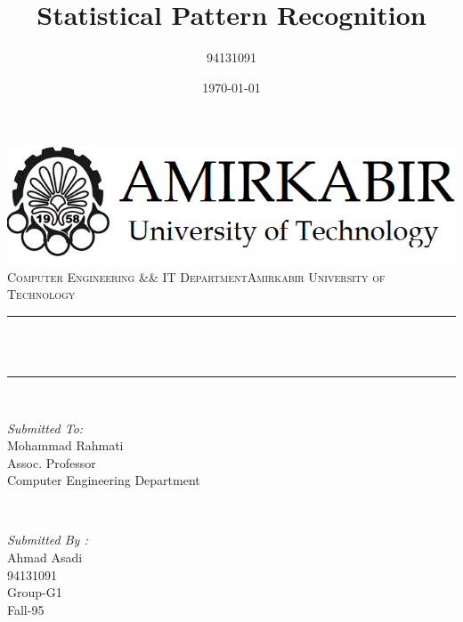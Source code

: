 \documentclass[12pt]{article}
\title{Statistical Pattern Recognition}								%
\author{94131091}								%
\date{\today}											%
\makeatletter
\let\thetitle\@title
\makeatother
\begin{document}

\begin{titlepage}
	\centering
    \vspace*{0.5 cm}
    \includegraphics[scale = 0.4]{Imgs/logo.png}\\[1.0 cm]	%
    \textsc{\Large Computer Engineering \&\& IT Department\newline\newline Amirkabir University of Technology}\\[2.0 cm]	%
	\rule{\linewidth}{0.2 mm} \\[0.4 cm]
	{ \huge \bfseries \thetitle}\\
	\rule{\linewidth}{0.2 mm} \\[1.5 cm]
	
	\begin{minipage}{0.4\textwidth}
		\begin{flushleft} \large
			\emph{Submitted To:}\\
			Mohammad Rahmati\\
            Assoc. Professor\\
            Computer Engineering Department\\
			\end{flushleft}
			\end{minipage}~
			\begin{minipage}{0.4\textwidth}
            
			\begin{flushright} \large
			\emph{Submitted By :} \\
			Ahmad Asadi\\
            94131091\\
            Group-G1\\
            Fall-95\\
		\end{flushright}
        
	\end{minipage}\\[2 cm]
	
	
    
    
    
    
	
\end{titlepage}
\end{document}

